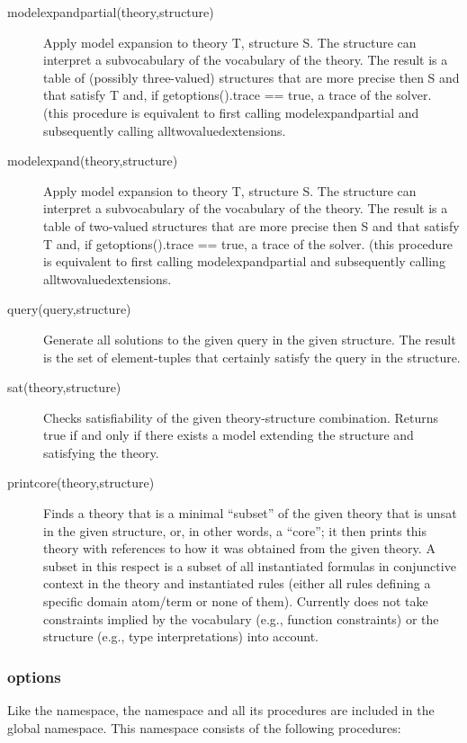 \begin{description}
	\item[modelexpandpartial(theory,structure)]
		Apply model expansion to theory T, structure S. The structure can interpret a subvocabulary of the vocabulary of the theory.
 		The result is a table of (possibly three-valued) structures that are more precise then S and that satisfy T  and, if getoptions().trace == true, a trace of the solver.
		(this procedure is equivalent to first calling modelexpandpartial and subsequently calling alltwovaluedextensions. 
	\item[modelexpand(theory,structure)]
 		Apply model expansion to theory T, structure S. The structure can interpret a subvocabulary of the vocabulary of the theory.
 		The result is a table of two-valued structures that are more precise then S and that satisfy T and, if getoptions().trace == true, a trace of the solver.
		(this procedure is equivalent to first calling modelexpandpartial and subsequently calling alltwovaluedextensions. 
		
	\item[query(query,structure)]
 		Generate all solutions to the given query in the given structure. The result is the set of element-tuples that certainly satisfy the query in the structure.
	\item[sat(theory,structure)]
		Checks satisfiability of the given theory-structure combination. Returns true if and only if there exists a model extending the structure and satisfying the theory.

	\item[printcore(theory,structure)]
		Finds a theory that is a minimal ``subset'' of the given theory that is unsat in the given structure, or, in other words, a ``core''; it then prints this theory with 
		references to how it was obtained from the given theory.
		A subset in this respect is a subset of all instantiated formulas in conjunctive context in the theory and instantiated rules 
		(either all rules defining a specific domain atom/term or none of them).
		Currently does not take constraints implied by the vocabulary (e.g., function constraints) or the structure (e.g., type interpretations) into account.  
		
\end{description}

\subsubsection{options}
Like the  namespace, the  namespace and all its procedures are included in the global namespace. This namespace consists of the following procedures:

